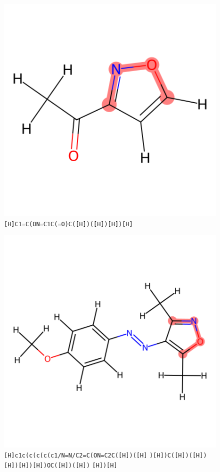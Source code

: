 \documentclass{article}
\begin{document}
\begin{figure}[ht]
\centering
    \includegraphics{mol04.png}
\cprotect\caption{\verb|[H]C1=C(ON=C1C(=O)C([H])([H])[H])[H]| }
\end{figure}

\begin{figure}[ht]
\centering
    \includegraphics{mol05.png}
\cprotect\caption{\verb|[H]c1c(c(c(c(c1/N=N/C2=C(ON=C2C([H])([H]| \verb|)[H])C([H])([H])[H])[H])[H])OC([H])([H])| \verb|[H])[H]| }
\end{figure}
\end{document}
